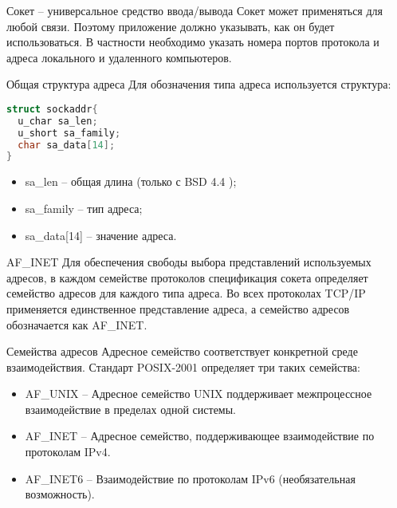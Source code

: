 \begin{frame}{Сокет -- универсальное средство ввода/вывода}
Сокет может применяться для любой связи. Поэтому приложение должно указывать, как он будет использоваться. В частности необходимо указать номера портов протокола и адреса локального и удаленного компьютеров. 
\end{frame}

\begin{frame}{Общая структура адреса}
Для обозначения типа адреса используется структура:

\begin{lstlisting}[language=C]
struct sockaddr{
  u_char sa_len;
  u_short sa_family;
  char sa_data[14];
}
\end{lstlisting}
\begin{itemize}
\item sa\_len -- общая длина (только с BSD 4.4 );
\item sa\_family -- тип адреса;
\item sa\_data[14] -- значение адреса.
\end{itemize}
\end{frame}

\begin{frame}{AF\_INET}
Для обеспечения свободы выбора представлений используемых адресов,  в каждом семействе протоколов спецификация сокета определяет семейство адресов для каждого типа адреса. Во всех протоколах TCP/IP применяется единственное представление адреса,  а семейство адресов обозначается как AF\_INET.
\end{frame}

\begin{frame}{Семейства адресов}
Адресное семейство соответствует конкретной среде взаимодействия. Стандарт POSIX-2001 определяет три таких семейства:
\begin{itemize}
	\item AF\_UNIX -- Адресное семейство UNIX поддерживает межпроцессное взаимодействие в пределах одной системы.
	\item AF\_INET -- Адресное семейство, поддерживающее взаимодействие по протоколам IPv4.
	\item AF\_INET6 -- Взаимодействие по протоколам IPv6 (необязательная возможность).
\end{itemize}
\end{frame}

